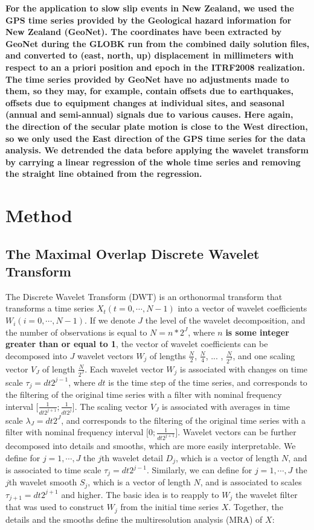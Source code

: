 \documentclass{article}
\begin{document}
\textbf{For the application to slow slip events in New Zealand, we used the GPS time series provided by the Geological hazard information for New Zealand (GeoNet). The coordinates have been extracted by GeoNet during the GLOBK run from the combined daily solution files, and converted to (east, north, up) displacement in millimeters with respect to an a priori position and epoch in the ITRF2008 realization. The time series provided by GeoNet have no adjustments made to them, so they may, for example, contain offsets due to earthquakes, offsets due to equipment changes at individual sites, and seasonal (annual and semi-annual) signals due to various causes. Here again, the direction of the secular plate motion is close to the West direction, so we only used the East direction of the GPS time series for the data analysis. We detrended the data before applying the wavelet transform by carrying a linear regression of the whole time series and removing the straight line obtained from the regression.}

\section{Method} 

\subsection{The Maximal Overlap Discrete Wavelet Transform}

The Discrete Wavelet Transform (DWT) is an orthonormal transform that transforms a time series $X_t \left( t = 0, \cdots , N - 1 \right)$ into a vector of wavelet coefficients $W_i \left( i = 0 , \cdots , N - 1 \right)$. If we denote $J$ the level of the wavelet decomposition, and the number of observations is equal to $N = n * 2^J$, where $n$ \textbf{is some integer greater than or equal to 1}, the vector of wavelet coefficients can be decomposed into $J$ wavelet vectors $W_j$ of lengths $\frac{N}{2}$, $\frac{N}{4}$, ... , $\frac{N}{2^J}$, and one scaling vector $V_J$ of length $\frac{N}{2^J}$. Each wavelet vector $W_j$ is associated with changes on time scale $\tau_j = dt 2^{j - 1}$, where $dt$ is the time step of the time series, and corresponds to the filtering of the original time series with a filter with nominal frequency interval $\lbrack \frac{1}{dt 2^{j + 1}} ; \frac{1}{dt 2^j} \rbrack$. The scaling vector $V_J$ is associated with averages in time scale $\lambda_J = dt 2^J$, and corresponds to the filtering of the original time series with a filter with nominal frequency interval $\lbrack 0 ; \frac{1}{dt 2^{j + 1}} \rbrack$. Wavelet vectors can be further decomposed into details and smooths, which are more easily interpretable. We define for $j = 1 , \cdots , J$ the $j$th wavelet detail $D_j$, which is a vector of length $N$, and is associated to time scale $\tau_j = dt 2^{j - 1}$. Similarly, we can define for $j = 1 , \cdots , J$ the $j$th wavelet smooth $S_j$, which is a vector of length $N$, and is associated to scales $\tau_{j + 1} = dt 2^{j + 1}$ and higher. The basic idea is to reapply to $W_j$ the wavelet filter that was used to construct $W_j$ from the initial time series $X$. Together, the details and the smooths define the multiresolution analysis (MRA) of $X$:
\end{document}
